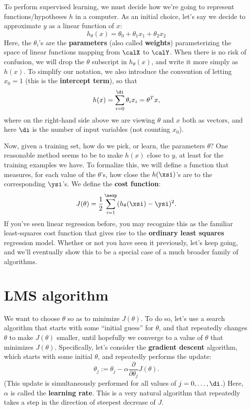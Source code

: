 \documentclass{article}
\begin{document}
To perform supervised learning, we must decide how we're going to
represent functions/hypotheses $h$ in a computer.  As an initial choice,
let's say we decide to approximate $y$ as a linear function of $x$:
\[
h_\theta(x) = \theta_0 + \theta_1 x_1 + \theta_2 x_2
\]
Here, the $\theta_i$'s are the {\bf parameters} (also called {\bf weights})
parameterizing the space
of linear functions mapping from $\calX$ to $\calY$.  When there is no
risk of confusion, we will drop the $\theta$ subscript in $h_\theta(x)$,
and write it more simply as $h(x)$.  To simplify our notation, we also
introduce the convention of letting $x_0 = 1$ (this is the
{\bf intercept term}), so that
\[
h(x) = \sum_{i=0}^\di \theta_i x_i = \theta^T x,
\]
where on the right-hand side above we are viewing $\theta$ and $x$ both as vectors, and
here $\di$ is the number of input variables (not counting $x_0$).

Now, given a training set, how do we pick, or learn, the parameters $\theta$?
One reasonable method seems to be to make $h(x)$ close to $y$, at least
for the training examples we have.  To formalize this, we will define a
function that measures, for each value of the $\theta$'s, how close
the $h(\xsi)$'s are to the corresponding $\ysi$'s.  We define the {\bf cost function}:
\[
J(\theta) = \frac{1}{2} \sum_{i=1}^{\nexp} (h_\theta(\xsi) - \ysi)^2.
\]
If you've seen linear regression before, you may recognize this as the
familiar least-squares cost function that gives rise to the
{\bf ordinary least squares} regression model.  Whether or not you have
seen it previously, let's keep going, and we'll eventually show this to
be a special case of a much broader family of algorithms.



\section{LMS algorithm}

We want to choose $\theta$ so as to minimize $J(\theta)$.  To do so, let's use a
search algorithm that starts with some ``initial guess'' for $\theta$, and that
repeatedly changes $\theta$ to make $J(\theta)$ smaller, until hopefully we converge
to a value of $\theta$ that minimizes $J(\theta)$.  Specifically, let's
consider the {\bf gradient descent} algorithm, which starts with some
initial $\theta$, and repeatedly performs the update:
\[
\theta_j := \theta_j - \alpha \frac{\partial}{\partial \theta_j} J(\theta).
\]
(This update is simultaneously performed for all values of $j=0,\ldots,\di$.)
Here, $\alpha$ is called the {\bf learning rate}.  This is a very natural
algorithm that repeatedly takes a step in the direction of steepest
decrease of $J$.
\end{document}
